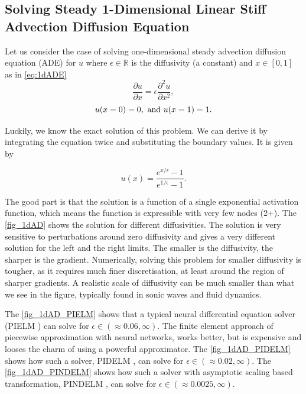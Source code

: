 \documentclass{article}
\begin{document}
\subsection{Solving Steady 1-Dimensional Linear Stiff Advection Diffusion Equation}
\label{steadyAdvectionDiffusion}

Let us consider the case of solving one-dimensional steady advection diffusion equation (ADE) for $u$ where $\epsilon \in \mathbb{R}$ is the diffusivity (a constant) and $x \in [0,1]$ as in \cref{eq:1dADE}
\begin{equation}
\label{eq:1dADE}
\frac{\partial u}{\partial x} = \epsilon \frac{\partial^2 u}{\partial x^2},
\end{equation}
\begin{equation}
u(x=0) = 0, \text{ and } u(x=1) = 1.\\
\end{equation}


Luckily, we know the exact solution of this problem. We can derive it by integrating the equation twice and substituting the boundary values. It is given by

\begin{equation}
\label{eq:1dADE_exact}
u(x) = \frac{e^{x/\epsilon} - 1}{e^{1/\epsilon} - 1}.
\end{equation}

The good part is that the solution is a function of a single exponential activation function, which means the function is expressible with very few nodes (2+). The \cref{fig_1dAD} shows the solution for different diffusivities. The solution is very sensitive to perturbations around zero diffusivity and gives a very different solution for the left and the right limits. The smaller is the diffusivity, the sharper is the gradient. Numerically, solving this problem for smaller diffusivity is tougher, as it requires much finer discretisation, at least around the region of sharper gradients. A realistic scale of diffusivity can be much smaller than what we see in the figure, typically found in sonic waves and fluid dynamics.    

The \cref{fig_1dAD_PIELM} shows that a typical neural differential equation solver (PIELM \cite{rout2019numerical}) can solve for $\epsilon \in (\approx 0.06, \infty) $. The finite element approach of piecewise approximation with neural networks, works better, but is expensive and looses the charm of using a powerful approximator. The \cref{fig_1dAD_PIDELM} shows how such a solver, PIDELM \cite{dwivedi2020physics}, can solve for $\epsilon \in (\approx 0.02, \infty) $. The \cref{fig_1dAD_PINDELM} shows how such a solver with asymptotic scaling based transformation, PINDELM \cite{rout2019numerical}, can solve for $\epsilon \in (\approx 0.0025, \infty)$.
\end{document}
